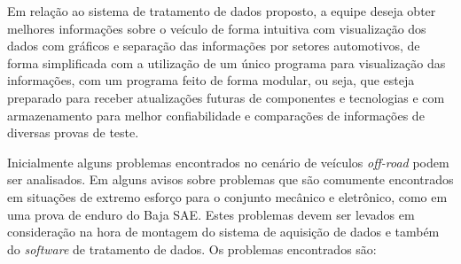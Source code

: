 Em relação ao sistema de tratamento de dados proposto, a equipe deseja obter melhores informações sobre o veículo de forma intuitiva com visualização dos dados com gráficos e separação das informações por setores automotivos, de forma simplificada com a utilização de um único programa para visualização das informações, com um programa feito de forma modular, ou seja, que esteja preparado para receber atualizações futuras de componentes e tecnologias e com armazenamento para melhor confiabilidade e comparações de informações de diversas provas de teste.   

Inicialmente alguns problemas encontrados no cenário de veículos \textit{off-road} podem ser analisados. Em  alguns avisos sobre problemas que são comumente encontrados em situações de extremo esforço para o conjunto mecânico e eletrônico, como em uma prova de enduro do Baja SAE. Estes problemas devem ser levados em consideração na hora de montagem do sistema de aquisição de dados e também do \textit{software} de tratamento de dados. Os problemas encontrados são:

